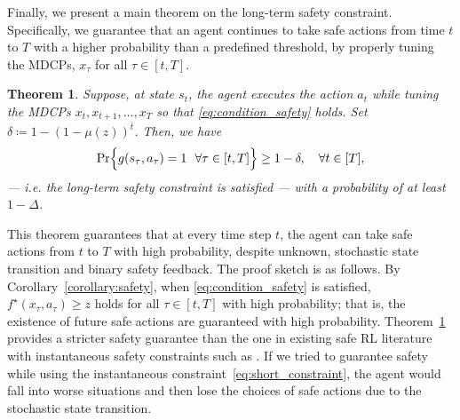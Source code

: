 \documentclass[letterpaper]{article} %
\newtheorem{theorem}{Theorem}
\begin{document}
Finally, we present a main theorem on the long-term safety constraint.
Specifically, we guarantee that an agent continues to take safe actions from time $t$ to $T$ with a higher probability than a predefined threshold, by properly tuning the MDCPs, $x_\tau$ for all $\tau \in [t, T]$.
%
\begin{theorem}
    \label{theorem:safety}
    Suppose, at state $s_t$, the agent executes the action $a_t$ while tuning the MDCPs $x_t, x_{t+1}, \ldots, x_T$ so that \eqref{eq:condition_safety} holds.
    Set $\delta \coloneqq 1 - (1 - \mu(z))^{\bar{t}}$.
    Then, we have
    \begin{align*}
    \label{eq:opt}
        \Pr \Bigl\{ g(s_\tau, a_\tau) = 1 \ \ \forall \tau \in [t, T] \Big\} \ge 1 - \delta, \quad \forall t \in [T],
    \end{align*}
    --- i.e. the long-term safety constraint is satisfied --- with a probability of at least $1-\Delta$.
\end{theorem}
%
\noindent
This theorem guarantees that at every time step $t$, the agent can take safe actions from $t$ to $T$ with high probability, despite unknown, stochastic state transition and binary safety feedback.
The proof sketch is as follows.
By Corollary~\ref{corollary:safety}, when \eqref{eq:condition_safety} is satisfied, $f^\star(x_\tau, a_\tau) \ge z$ holds for all $\tau \in [t, T]$ with high probability; that is, the existence of future safe actions are guaranteed with high probability.
Theorem~\ref{theorem:safety} provides a stricter safety guarantee than the one in existing safe RL literature with instantaneous safety constraints such as \citet{wachi2021safe}.
If we tried to guarantee safety while using the instantaneous constraint~\eqref{eq:short_constraint}, the agent would fall into worse situations and then lose the choices of safe actions due to the stochastic state transition.
\end{document}
